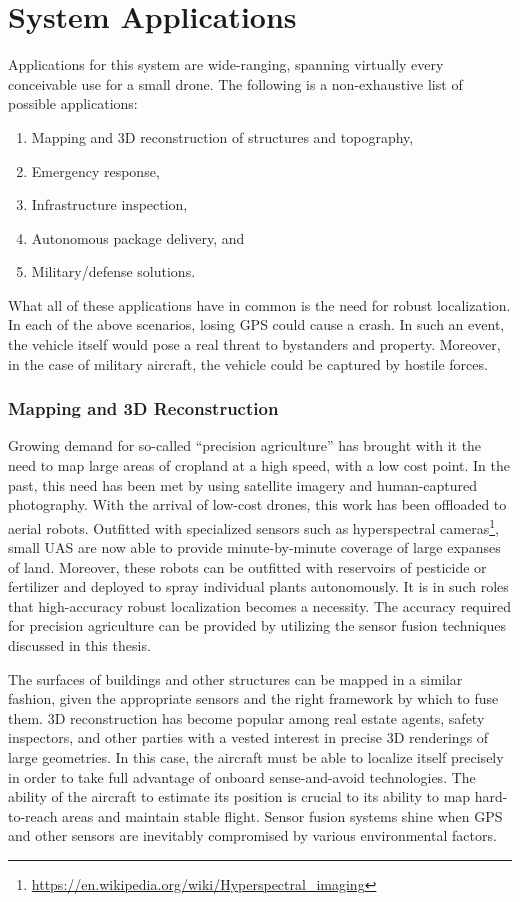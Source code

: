 \section{System Applications}

Applications for this system are wide-ranging, spanning virtually every conceivable use for a small drone. The following is a non-exhaustive list of possible applications:
\begin{enumerate}
    \item Mapping and 3D reconstruction of structures and topography,
    \item Emergency response,
    \item Infrastructure inspection,
    \item Autonomous package delivery, and
    \item Military/defense solutions.
\end{enumerate}
What all of these applications have in common is the need for robust localization. In each of the above scenarios, losing GPS could cause a crash. In such an event, the vehicle itself would pose a real threat to bystanders and property. Moreover, in the case of military aircraft, the vehicle could be captured by hostile forces.

\subsubsection{Mapping and 3D Reconstruction}

Growing demand for so-called ``precision agriculture'' has brought with it the need to map large areas of cropland at a high speed, with a low cost point. In the past, this need has been met by using satellite imagery and human-captured photography. With the arrival of low-cost drones, this work has been offloaded to aerial robots. Outfitted with specialized sensors such as hyperspectral cameras\footnote{\url{https://en.wikipedia.org/wiki/Hyperspectral_imaging}}, small UAS are now able to provide minute-by-minute coverage of large expanses of land. Moreover, these robots can be outfitted with reservoirs of pesticide or fertilizer and deployed to spray individual plants autonomously. It is in such roles that high-accuracy robust localization becomes a necessity. The accuracy required for precision agriculture can be provided by utilizing the sensor fusion techniques discussed in this thesis.

The surfaces of buildings and other structures can be mapped in a similar fashion, given the appropriate sensors and the right framework by which to fuse them. 3D reconstruction has become popular among real estate agents, safety inspectors, and other parties with a vested interest in precise 3D renderings of large geometries. In this case, the aircraft must be able to localize itself precisely in order to take full advantage of onboard sense-and-avoid technologies. The ability of the aircraft to estimate its position is crucial to its ability to map hard-to-reach areas and maintain stable flight. Sensor fusion systems shine when GPS and other sensors are inevitably compromised by various environmental factors.

